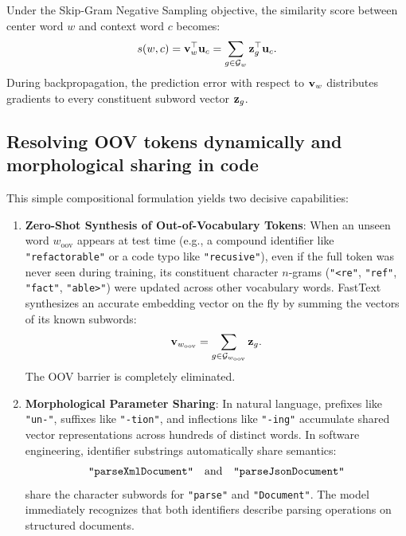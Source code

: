 \documentclass[../../main.tex]{subfiles}
\begin{document}
Under the Skip-Gram Negative Sampling objective, the similarity score between center word $w$ and context word $c$ becomes:
\begin{equation}
\label{eq:fasttext_scoring}
s(w, c) = \mathbf{v}_w^\top \mathbf{u}_c = \sum_{g \in \mathcal{G}_w} \mathbf{z}_g^\top \mathbf{u}_c.
\end{equation}
During backpropagation, the prediction error with respect to $\mathbf{v}_w$ distributes gradients to every constituent subword vector $\mathbf{z}_g$.

\subsection{Resolving OOV tokens dynamically and morphological sharing in code}
\label{subsec:fasttext_oov_resolution}

This simple compositional formulation yields two decisive capabilities:

\begin{enumerate}
    \item \textbf{Zero-Shot Synthesis of Out-of-Vocabulary Tokens}:
    When an unseen word $w_{\text{oov}}$ appears at test time (e.g., a compound identifier like \texttt{"refactorable"} or a code typo like \texttt{"recusive"}), even if the full token was never seen during training, its constituent character $n$-grams (\texttt{"<re"}, \texttt{"ref"}, \texttt{"fact"}, \texttt{"able>"}) were updated across other vocabulary words.
    FastText synthesizes an accurate embedding vector on the fly by summing the vectors of its known subwords:
    \begin{equation}
    \label{eq:fasttext_oov_synth}
    \mathbf{v}_{w_{\text{oov}}} = \sum_{g \in \mathcal{G}_{w_{\text{oov}}}} \mathbf{z}_g.
    \end{equation}
    The OOV barrier is completely eliminated.
    
    \item \textbf{Morphological Parameter Sharing}:
    In natural language, prefixes like \texttt{"un-"}, suffixes like \texttt{"-tion"}, and inflections like \texttt{"-ing"} accumulate shared vector representations across hundreds of distinct words.
    In software engineering, identifier substrings automatically share semantics:
    \begin{equation}
    \label{eq:code_subword_sharing}
    \text{\texttt{"parseXmlDocument"}} \quad \text{and} \quad \text{\texttt{"parseJsonDocument"}}
    \end{equation}
    share the character subwords for \texttt{"parse"} and \texttt{"Document"}. The model immediately recognizes that both identifiers describe parsing operations on structured documents.
\end{enumerate}
\end{document}

